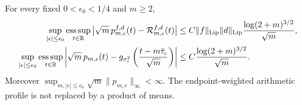\begin{theorem}
\label{thm:v60-perturbed-density}
For every fixed $0<\epsilon_0<1/4$ and $m\ge2$,
\begin{align}
 \sup_{|\epsilon|\le\epsilon_0}\operatorname*{ess\,sup}_{t\in\R}
 \left|\sqrt m\,p_{m,\epsilon}^{f,d}(t)
                   -\mathcal R_{m,\epsilon}^{f,d}(t)\right|
 &\le C\|f\|_{\rm Lip}\|d\|_{\rm Lip}
                  \frac{\log(2+m)^{3/2}}{\sqrt m},
                                                   \label{eq:v60-weighted-pointwise}\\
 \sup_{|\epsilon|\le\epsilon_0}\operatorname*{ess\,sup}_{t\in\R}
 \left|\sqrt m\,p_{m,\epsilon}(t)
 -g_{\sigma_\epsilon^2}\left(\frac{t-m\bar\tau_\epsilon}{\sqrt m}\right)\right|
 &\le C\frac{\log(2+m)^{3/2}}{\sqrt m}.
                                                   \label{eq:v60-unweighted-pointwise}
\end{align}
Moreover $\sup_{m,|\epsilon|\le\epsilon_0}\sqrt m
\|p_{m,\epsilon}\|_\infty<\infty$. The endpoint-weighted arithmetic
profile is not replaced by a product of means.
\end{theorem}
